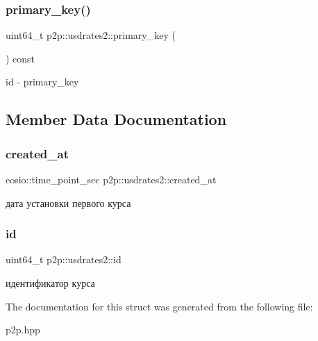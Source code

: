 \subsubsection{\texorpdfstring{primary\+\_\+key()}{primary\_key()}}
{\footnotesize\ttfamily uint64\+\_\+t p2p\+::usdrates2\+::primary\+\_\+key (\begin{DoxyParamCaption}{ }\end{DoxyParamCaption}) const\hspace{0.3cm}{\ttfamily [inline]}}

id -\/ primary\+\_\+key 

\subsection{Member Data Documentation}
\mbox{\label{structp2p_1_1usdrates2_a2f8aa31571d84a178259fa42461cf140}} 
\subsubsection{\texorpdfstring{created\+\_\+at}{created\_at}}
{\footnotesize\ttfamily eosio\+::time\+\_\+point\+\_\+sec p2p\+::usdrates2\+::created\+\_\+at}

дата установки первого курса \mbox{\label{structp2p_1_1usdrates2_aba230f3a86e3c9eb693c41d501378c22}} 
\subsubsection{\texorpdfstring{id}{id}}
{\footnotesize\ttfamily uint64\+\_\+t p2p\+::usdrates2\+::id}

идентификатор курса 

The documentation for this struct was generated from the following file\+:\begin{DoxyCompactItemize}
\item 
p2p.\+hpp\end{DoxyCompactItemize}
